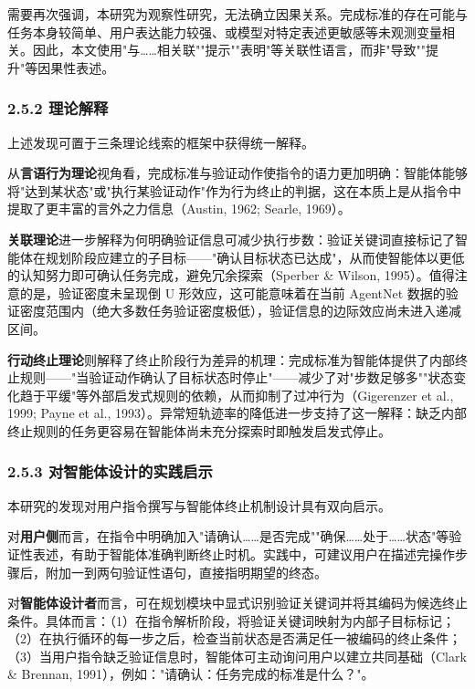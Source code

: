\documentclass[12pt,a4paper,openany,oneside]{ctexrep}
\begin{document}
需要再次强调，本研究为观察性研究，无法确立因果关系。完成标准的存在可能与任务本身较简单、用户表达能力较强、或模型对特定表述更敏感等未观测变量相关。因此，本文使用"与……相关联""提示""表明"等关联性语言，而非"导致""提升"等因果性表述。

\subsubsection{2.5.2 理论解释}


上述发现可置于三条理论线索的框架中获得统一解释。

从\textbf{言语行为理论}视角看，完成标准与验证动作使指令的语力更加明确：智能体能够将"达到某状态"或"执行某验证动作"作为行为终止的判据，这在本质上是从指令中提取了更丰富的言外之力信息（Austin, 1962; Searle, 1969）。

\textbf{关联理论}进一步解释为何明确验证信息可减少执行步数：验证关键词直接标记了智能体在规划阶段应建立的子目标——"确认目标状态已达成"，从而使智能体以更低的认知努力即可确认任务完成，避免冗余探索（Sperber \& Wilson, 1995）。值得注意的是，验证密度未呈现倒 U 形效应，这可能意味着在当前 AgentNet 数据的验证密度范围内（绝大多数任务验证密度极低），验证信息的边际效应尚未进入递减区间。

\textbf{行动终止理论}则解释了终止阶段行为差异的机理：完成标准为智能体提供了内部终止规则——"当验证动作确认了目标状态时停止"——减少了对"步数足够多""状态变化趋于平缓"等外部启发式规则的依赖，从而抑制了过冲行为（Gigerenzer et al., 1999; Payne et al., 1993）。异常短轨迹率的降低进一步支持了这一解释：缺乏内部终止规则的任务更容易在智能体尚未充分探索时即触发启发式停止。

\subsubsection{2.5.3 对智能体设计的实践启示}


本研究的发现对用户指令撰写与智能体终止机制设计具有双向启示。

对\textbf{用户侧}而言，在指令中明确加入"请确认……是否完成""确保……处于……状态"等验证性表述，有助于智能体准确判断终止时机。实践中，可建议用户在描述完操作步骤后，附加一到两句验证性语句，直接指明期望的终态。

对\textbf{智能体设计者}而言，可在规划模块中显式识别验证关键词并将其编码为候选终止条件。具体而言：（1）在指令解析阶段，将验证关键词映射为内部子目标标记；（2）在执行循环的每一步之后，检查当前状态是否满足任一被编码的终止条件；（3）当用户指令缺乏验证信息时，智能体可主动询问用户以建立共同基础（Clark \& Brennan, 1991），例如："请确认：任务完成的标准是什么？"。
\end{document}
